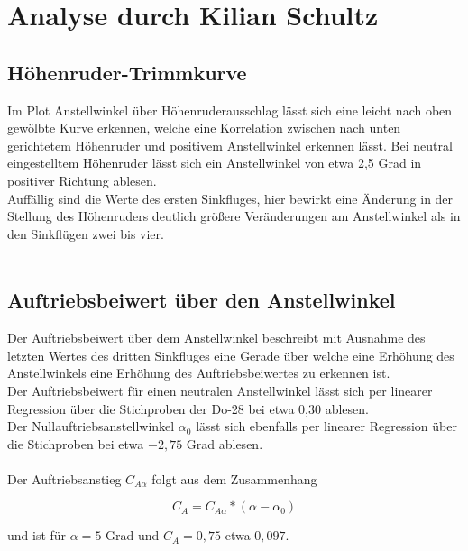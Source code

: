 \section{Analyse durch Kilian Schultz}
\subsection{Höhenruder-Trimmkurve}
Im Plot Anstellwinkel über Höhenruderausschlag lässt sich eine leicht nach oben gewölbte Kurve erkennen, welche eine Korrelation zwischen nach unten gerichtetem Höhenruder und positivem Anstellwinkel erkennen lässt. Bei neutral eingestelltem Höhenruder lässt sich ein Anstellwinkel von etwa 2,5 Grad in positiver Richtung ablesen.\\
Auffällig sind die Werte des ersten Sinkfluges, hier bewirkt eine Änderung in der Stellung des Höhenruders deutlich größere Veränderungen am Anstellwinkel als in den Sinkflügen zwei bis vier.\\\\	

\subsection{Auftriebsbeiwert über den Anstellwinkel}
Der Auftriebsbeiwert über dem Anstellwinkel beschreibt mit Ausnahme des letzten Wertes des dritten Sinkfluges eine Gerade über welche eine Erhöhung des Anstellwinkels eine Erhöhung des Auftriebsbeiwertes zu erkennen ist.\\
Der Auftriebsbeiwert für einen neutralen Anstellwinkel lässt sich per linearer Regression über die Stichproben der Do-28 bei etwa 0,30 ablesen.\\
Der Nullauftriebsanstellwinkel $\alpha_{0}$ lässt sich ebenfalls per linearer Regression über die Stichproben bei etwa $-2,75$ Grad ablesen.\\\\
Der Auftriebsanstieg $C_{A\alpha}$ folgt aus dem Zusammenhang

\begin{equation*}
C_{A} = C_{A\alpha} * (\alpha-\alpha_{0})
\end{equation*}

\vspace{5mm}
\noindent und ist für $\alpha = 5$ Grad und $C_{A} = 0,75$ etwa $0,097$.\\\\

